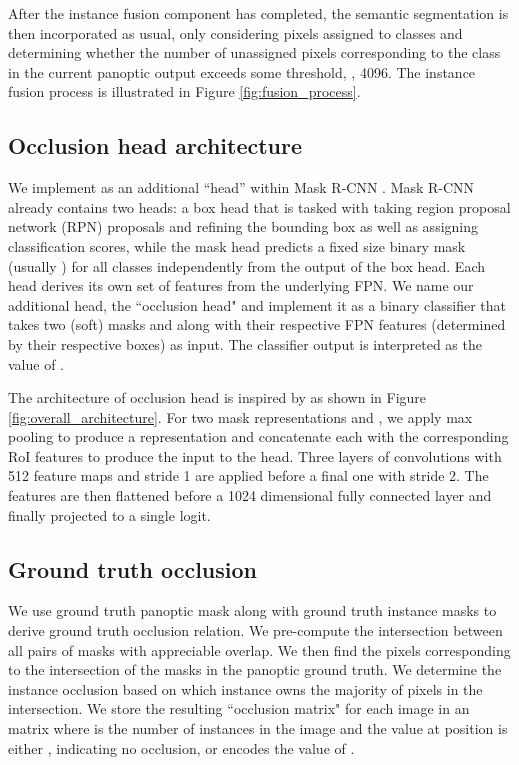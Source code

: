\documentclass[10pt,twocolumn,letterpaper]{article}
\begin{document}
After the instance fusion component has completed, the semantic segmentation is then incorporated as usual, only considering pixels assigned to  classes and determining whether the number of unassigned pixels corresponding to the class in the current panoptic output exceeds some threshold, \eg, 4096. The instance fusion process is illustrated in Figure \ref{fig:fusion_process}.



\subsection{Occlusion head architecture}
\label{sec:architecture_of_occlusion_head}
We implement  as an additional ``head'' within Mask R-CNN \cite{he2017mask}. Mask R-CNN already contains two heads: a box head that is tasked with taking region proposal network (RPN) proposals and refining the bounding box as well as assigning classification scores, while the mask head predicts a fixed size binary mask (usually ) for all classes independently from the output of the box head. Each head derives its own set of features from the underlying FPN. We name our additional head, the ``occlusion head" and implement it as a binary classifier that takes two (soft) masks  and  along with their respective FPN features (determined by their respective boxes) as input. The classifier output is interpreted as the value of .


The architecture of occlusion head is inspired by \cite{huang2019mask} as shown in Figure \ref{fig:overall_architecture}. For two mask representations  and , we apply max pooling to produce a  representation and concatenate each with the corresponding RoI features to produce the input to the head. Three layers of  convolutions with 512 feature maps and stride 1 are applied before a final one with stride 2. The features are then flattened before a 1024 dimensional fully connected layer and finally projected to a single logit.


\subsection{Ground truth occlusion} \label{sec:gt_occlusion}

We use ground truth panoptic mask along with ground truth instance masks to derive ground truth occlusion relation. We pre-compute the intersection between all pairs of masks with appreciable overlap. We then find the pixels corresponding to the intersection of the masks in the panoptic ground truth. We determine the instance occlusion based on which instance owns the majority of pixels in the intersection. We store the resulting ``occlusion matrix" for each image in an  matrix where  is the number of instances in the image and the value at position  is either , indicating no occlusion, or encodes the value of .
\end{document}

